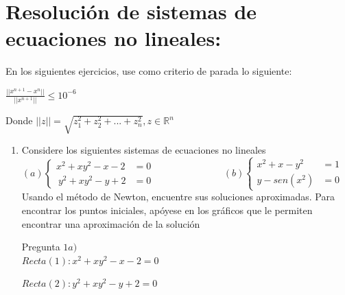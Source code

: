 \documentclass{udparticle}
\begin{document}
\section{Resolución de sistemas de ecuaciones no lineales:}
    
        
        En los siguientes ejercicios, use como criterio de parada lo siguiente:
        \begin{center}
            $ \frac{|| x^{n+1} - x^{n} ||}{|| x^{n+1} ||} \leq 10^{-6} $  
        \end{center}

        Donde $||z||=\sqrt{z_{1}^{2} + z_{2}^2+...+z_{n}^{2}} , z \in \mathbb{R}^{n}$
    \begin{enumerate}   
        
        \item Considere los siguientes sistemas de ecuaciones no lineales\\
        
        \begin{math}
            (a)\left\lbrace
          \begin{array}{ll}
                x^2 + xy^2-x-2&=0 \\\
                y^2 + xy^2-y+2&=0
            \end{array}
            \right.
            \hspace{3cm}
            (b) \left\lbrace
           \begin{array}{ll}
                 x^2+x-y^2&=1  \\
                 y-sen(x^2)&=0 
            \end{array}
            \right.
        \end{math}\\
        
        Usando el método de Newton, encuentre sus soluciones aproximadas. Para encontrar los puntos iniciales, apóyese en los gráficos que le permiten encontrar una aproximación de la solución 
        
        
        Pregunta $ 1a) $\\
        
            
            $ Recta(1) : x^2+xy^2-x-2=0 $
            
            $ Recta(2) : y^2 +xy^2-y+2=0 $
            

\end{enumerate}
\end{document}
